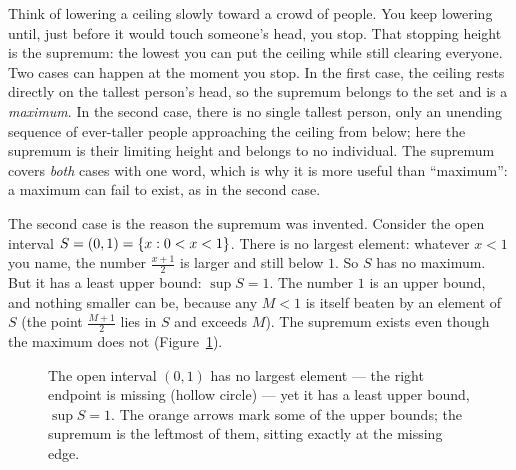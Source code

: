 \begin{intuitionbox}
Think of lowering a ceiling slowly toward a crowd of people. You keep lowering until,
just before it would touch someone's head, you stop. That stopping height is the
supremum: the lowest you can put the ceiling while still clearing everyone. Two cases
can happen at the moment you stop. In the first case, the ceiling rests directly on the tallest person's
head, so the supremum belongs to the set and is a \emph{maximum}. In the second case, there is no single
tallest person, only an unending sequence of ever-taller people approaching
the ceiling from below; here the supremum is their limiting height and
belongs to no individual. The supremum covers \emph{both} cases with one word, which is
why it is more useful than ``maximum'': a maximum can fail to exist, as in the second case.
\end{intuitionbox}

The second case is the reason the supremum
was invented. Consider the open interval $S = (0,1) = \{x : 0 < x < 1\}$. There is no largest
element: whatever $x<1$ you name, the number $\frac{x+1}{2}$ is larger and still below
$1$. So $S$ has no maximum. But it has a least upper bound: $\sup S = 1$. The
number $1$ is an upper bound, and nothing smaller can be, because any $M<1$ is itself
beaten by an element of $S$ (the point $\frac{M+1}{2}$ lies in $S$ and exceeds $M$). The
supremum exists even though the maximum does not (Figure~\ref{ch41:fig-sup}).

\begin{figure}[H]
\centering
{}
\caption{The open interval $(0,1)$ has no largest element --- the right endpoint is
missing (hollow circle) --- yet it has a least upper bound, $\sup S = 1$. The orange
arrows mark some of the upper bounds; the supremum is the leftmost of them, sitting
exactly at the missing edge.}
\label{ch41:fig-sup}
\end{figure}

